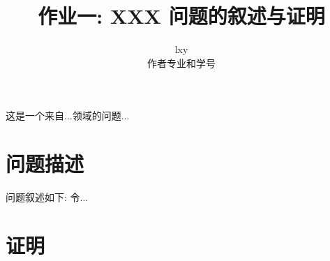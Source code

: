 \documentclass{ctexart}
\title{作业一: XXX 问题的叙述与证明}
\author{lxy \\ 作者专业和学号}
\begin{document}
\maketitle


这是一个来自...领域的问题...
\section{问题描述}
问题叙述如下: 令...

\section{证明}
\end{document}
